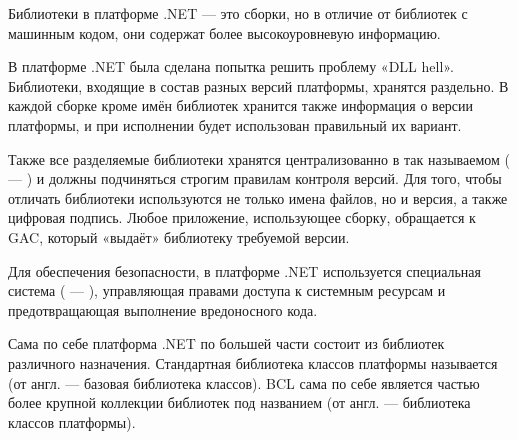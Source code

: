 Библиотеки в платформе .NET — это сборки, но в отличие от библиотек с
машинным кодом, они содержат более высокоуровневую информацию.

В платформе .NET была сделана попытка решить проблему «DLL
  hell». Библиотеки, входящие в состав разных версий платформы,
хранятся раздельно. В каждой сборке кроме имён библиотек хранится
также информация о версии платформы, и при исполнении будет
использован правильный их вариант.

Также все разделяемые библиотеки хранятся централизованно в так
называемом 
( — ) и должны подчиняться строгим правилам контроля версий. Для
того, чтобы отличать библиотеки используются не только имена файлов,
но и версия, а также цифровая подпись. Любое приложение, использующее
сборку, обращается к GAC, который «выдаёт» библиотеку требуемой
версии.

Для обеспечения безопасности, в платформе .NET используется
специальная система ( — ), управляющая правами доступа к
системным ресурсам и предотвращающая выполнение вредоносного кода.


Сама по себе платформа .NET по большей части состоит из библиотек
различного назначения. Стандартная библиотека классов платформы
называется  (от англ.  — базовая библиотека классов). BCL сама по себе
является частью более крупной коллекции библиотек под названием
 (от англ.  — библиотека классов платформы).

